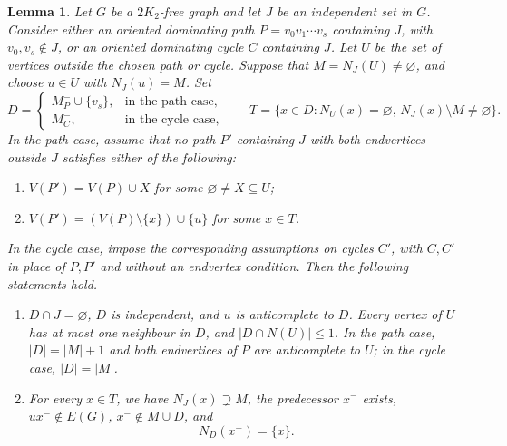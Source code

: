 \documentclass[11pt]{article}
\numberwithin{equation}{section}
\newtheorem{lemma}[theorem]{Lemma}
\theoremstyle{plain}
\theoremstyle{definition}
\theoremstyle{plain}
\begin{document}
\begin{lemma}\label{lem:predecessor-structure}
Let $G$ be a $2K_2$-free graph and let $J$ be an independent set
in $G$. Consider either an oriented dominating path $P=v_0v_1\cdots v_s$
containing $J$, with $v_0,v_s\notin J$, or an oriented dominating cycle $C$
containing $J$. Let $U$ be the set of vertices outside the chosen
path or cycle. Suppose that $M=N_J(U)\neq\varnothing$,
and choose $u\in U$ with $N_J(u)=M$.
  Set
\[
    D=
    \begin{cases}
        M_P^-\cup\{v_s\},&\text{in the path case},\\
        M_C^-,&\text{in the cycle case},
    \end{cases}
    \qquad
    T=\{x\in D:N_U(x)=\varnothing,\,
                   N_J(x)\setminus M\neq\varnothing\}.
\]
In the path case, assume that no path $P'$ containing $J$ with
both endvertices outside $J$ satisfies either of the following:
\begin{enumerate}[label=\textup{(\alph*)},nosep]
    \item $V(P')=V(P)\cup X$ for some
    $\varnothing\neq X\subseteq U$;
    \item $V(P')=(V(P)\setminus\{x\})\cup\{u\}$ for some $x\in T$.
\end{enumerate}
In the cycle case, impose the corresponding assumptions on cycles
$C'$, with $C,C'$ in place of $P,P'$ and without an endvertex
condition. Then the following statements hold.
\begin{enumerate}[label=\textup{(\roman*)},nosep]
    \item $D\cap J=\varnothing$, $D$ is independent, and $u$ is
    anticomplete to $D$. Every vertex of $U$ has at most one
    neighbour in $D$, and $|D\cap N(U)|\leq1$.
    In the path case, $|D|=|M|+1$ and both endvertices of $P$
    are anticomplete to $U$; in the cycle case, $|D|=|M|$.

    \item For every $x\in T$, we have $N_J(x)\supsetneq M$,
    the predecessor $x^-$ exists, $ux^-\notin E(G)$,
    $x^-\notin M\cup D$, and
    \begin{equation}\label{eq:ND-predecessor}
        N_D(x^-)=\{x\}.
    \end{equation}
\end{enumerate}
\end{lemma}
\end{document}
